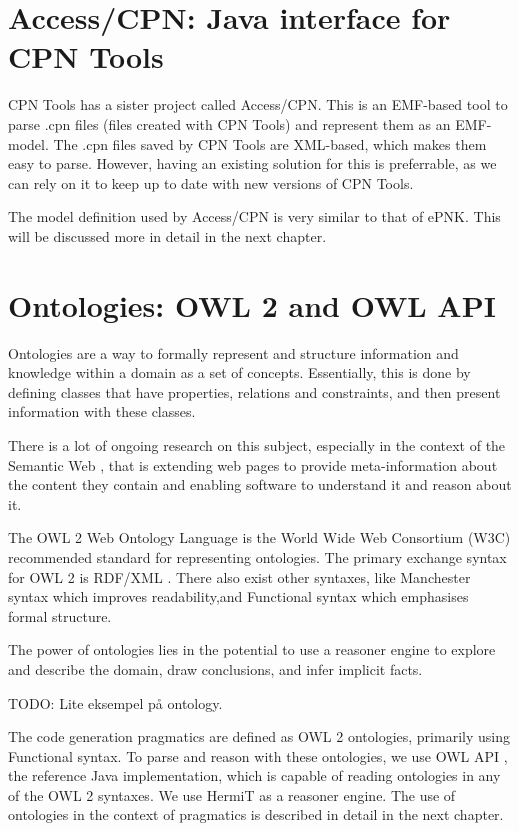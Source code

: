 \section{Access/CPN: Java interface for CPN Tools}
CPN Tools has a sister project called Access/CPN. This is an
EMF-based tool to parse .cpn files (files created with CPN Tools) and represent
them as an EMF-model. The .cpn files saved by CPN Tools are XML-based, which makes them
easy to parse. However, having an existing solution for this is preferrable, as
we can rely on it to keep up to date with new versions of CPN Tools.

The model definition used by Access/CPN is very similar to that of ePNK. This
will be discussed more in detail in the next chapter.

\section{Ontologies: OWL 2 and OWL API}\label{sec:ontologies}

Ontologies are a way to formally represent and structure information and
knowledge within a domain as a set of concepts. Essentially, this is done
by defining classes that have properties, relations and constraints, and then present
information with these classes.

There is a lot of ongoing research on this subject, especially in the context of
the Semantic Web \cite{bernerslee2001semantic}, that is extending web pages to
provide meta-information about the content they contain and enabling software to
understand it and reason about it.

The OWL 2 Web Ontology Language \cite{owl2-overview} is the World Wide Web
Consortium (W3C) recommended standard for representing ontologies. The primary
exchange syntax for OWL 2 is RDF/XML \cite{rdf-xml}. There also exist
other syntaxes, like Manchester syntax which improves readability,and
Functional syntax which emphasises formal structure.

The power of ontologies lies in the potential to use a reasoner engine to
explore and describe the domain, draw conclusions, and infer implicit facts.

TODO: Lite eksempel på ontology.

The code generation pragmatics are defined as OWL 2 ontologies, primarily using
Functional syntax. To parse and reason with these ontologies, we use OWL API
\cite{owlapi}, the reference Java implementation, which is capable of reading
ontologies in any of the OWL 2 syntaxes. We use HermiT \cite{shearer2008hermit}
as a reasoner engine. The use of ontologies in the context of pragmatics is
described in detail in the next chapter.